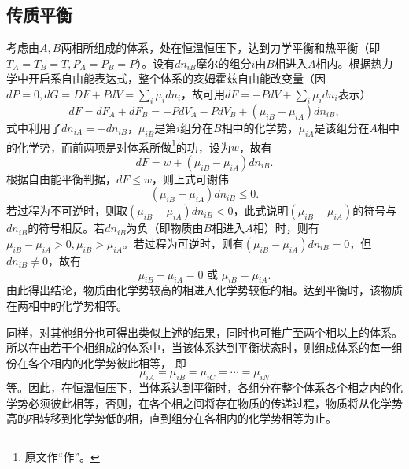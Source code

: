 ﻿\subsection{传质平衡}
考虑由$A,B$两相所组成的体系，处在恒温恒压下，达到力学平衡和热平衡（即$T_A=T_B=T,P_A=P_B=P$）。设有$dn_{iB}$摩尔的组分$i$由$B$相进入$A$相内。根据热力学中开启系自由能表达式，整个体系的亥姆霍兹自由能改变量（因$dP=0,dG=DF+PdV=\sum\limits_i{\mu_idn_i}$，故可用$dF=-PdV+\sum\limits_i{\mu_idn_i}$表示）
\begin{equation}
dF=dF_A+dF_B=-PdV_A-PdV_B+(\mu_{iB}-\mu_{iA})dn_{iB},
\end{equation}
式中利用了$dn_{iA}=-dn_{iB}$，$\mu_{iB}$是第$i$组分在$B$相中的化学势，$\mu_{iA}$是该组分在$A$相中的化学势，而前两项是对体系所做\footnote{原文作“作”。}的功，设为$w$，故有
\begin{equation}
dF=w+(\mu_{iB}-\mu_{iA})dn_{iB}.
\end{equation}
根据自由能平衡判据，$dF\leq w$，则上式可谢伟
\begin{equation}
(\mu_{iB}-\mu_{iA})dn_{iB}\leq 0.
\end{equation}
若过程为不可逆时，则取$(\mu_{iB}-\mu_{iA})dn_{iB}<0$，此式说明$(\mu_{iB}-\mu_{iA})$的符号与$dn_{iB}$的符号相反。若$dn_{iB}$为负（即物质由$B$相进入$A$相）时，则有$\mu_{iB}-\mu_{iA}>0,\mu_{iB}>\mu_{iA}$。若过程为可逆时，则有$(\mu_{iB}-\mu_{iA})dn_{iB}=0$，但$dn_{iB}\neq 0$，故有
\begin{equation}
\mu_{iB}-\mu_{iA}=0\text{ 或 }\mu_{iB}=\mu_{iA}.
\end{equation}
由此得出结论，物质由化学势较高的相进入化学势较低的相。达到平衡时，该物质在两相中的化学势相等。

同样，对其他组分也可得出类似上述的结果，同时也可推广至两个相以上的体系。所以在由若干个相组成的体系中，当该体系达到平衡状态时，则组成体系的每一组份在各个相内的化学势彼此相等， 即
\begin{equation}
\mu_{iA}=\mu_{iB}=\mu_{iC}=\cdots=\mu_{iN}
\end{equation}
等。因此，在恒温恒压下，当体系达到平衡时，各组分在整个体系各个相之内的化学势必须彼此相等，否则，在各个相之间将存在物质的传递过程，物质将从化学势高的相转移到化学势低的相，直到组分在各相内的化学势相等为止。
